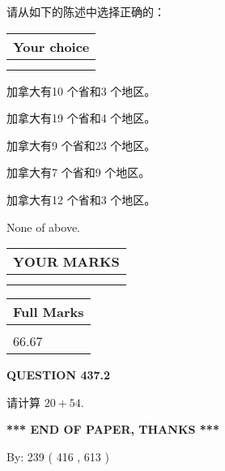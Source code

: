\documentclass{ctexart}
\begin{document}
  
请从如下的陈述中选择正确的：
  
  
\noindent\hspace{3.0in} \begin{tabular}{|l|}
\hline
Your choice \\
\hline
 \\ 
 \\ 
\hline
\end{tabular}
  
  
 
 
加拿大有10 个省和3 个地区。
 
 
加拿大有19 个省和4 个地区。
 
 
加拿大有9 个省和23 个地区。
 
 
加拿大有7 个省和9 个地区。
 
 
加拿大有12 个省和3 个地区。
 
 
 None of above.
 
 
  
\vspace{0.2in}
  
\noindent\begin{tabular}{|l|}
\hline
 YOUR MARKS  \\
\hline
 \\ 
 \\ 
\hline
\end{tabular}
\hspace{0.05in} \begin{tabular}{|l|}
\hline
 Full Marks  \\
\hline
 \\ 
66.67 \\
\hline
\end{tabular}
{\textbf{\Large{QUESTION
437.2 
}}}
  
  
 
请计算 $ %
20 +  %
54 $.
 

 

 
   
   
 \vspace{0.2in}
 
   
   
   
   
\vspace{1.0in} 
{\textbf{\large{ *** END OF PAPER, THANKS *** }}} 
   
   
\hspace{1.0in} By: 
 239 ( 416 ,  613 )
   
\end{document}
